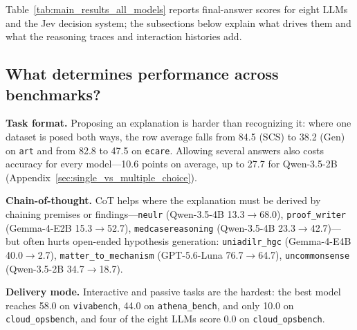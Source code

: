 
\label{sec:experiments}
\label{sec:results}

\graphicspath{{prism-uploads/}{figures/}{./}}

Table~\ref{tab:main_results_all_models} reports final-answer scores for eight LLMs and the Jev decision system; the subsections below explain what drives them and what the reasoning traces and interaction histories add.

\subsection{What determines performance across benchmarks?}
\label{sec:main_results}

\textbf{Task format.} Proposing an explanation is harder than recognizing it: where one dataset is posed both ways, the row average falls from 84.5 (SCS) to 38.2 (Gen) on \texttt{art} and from 82.8 to 47.5 on \texttt{ecare}. Allowing several answers also costs accuracy for every model---10.6 points on average, up to 27.7 for Qwen-3.5-2B (Appendix~\ref{sec:single_vs_multiple_choice}).

\textbf{Chain-of-thought.} CoT helps where the explanation must be derived by chaining premises or findings---\texttt{neulr} (Qwen-3.5-4B 13.3$\to$68.0), \texttt{proof\_writer} (Gemma-4-E2B 15.3$\to$52.7), \texttt{medcasereasoning} (Qwen-3.5-4B 23.3$\to$42.7)---but often hurts open-ended hypothesis generation: \texttt{uniadilr\_hgc} (Gemma-4-E4B 40.0$\to$2.7), \texttt{matter\_to\_mechanism} (GPT-5.6-Luna 76.7$\to$64.7), \texttt{uncommonsense} (Qwen-3.5-2B 34.7$\to$18.7).

\textbf{Delivery mode.} Interactive and passive tasks are the hardest: the best model reaches 58.0 on \texttt{vivabench}, 44.0 on \texttt{athena\_bench}, and only 10.0 on \texttt{cloud\_opsbench}, and four of the eight LLMs score 0.0 on \texttt{cloud\_opsbench}.

